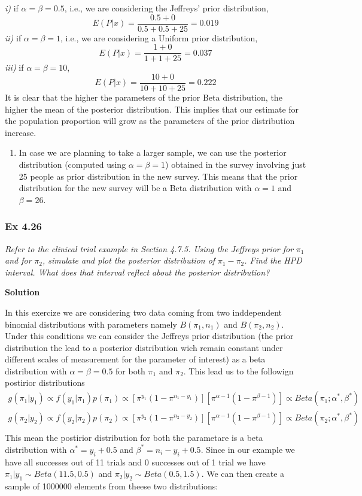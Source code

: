 \documentclass[
]{article}
\providecommand{\tightlist}{%
  \setlength{\itemsep}{0pt}\setlength{\parskip}{0pt}}
\begin{document}
\emph{i)} if \(\alpha=\beta=0.5\), i.e., we are considering the
Jeffreys' prior distribution, \[
E(P|x)=\frac{0.5 + 0}{0.5 + 0.5 + 25}= 0.019
\] \emph{ii)} if \(\alpha=\beta=1\), i.e., we are considering a Uniform
prior distribution, \[
E(P|x)=\frac{1 + 0}{1 + 1 + 25}= 0.037
\] \emph{iii)} if \(\alpha=\beta=10\), \[
E(P|x)=\frac{10 + 0}{10 + 10 + 25}= 0.222
\] It is clear that the higher the parameters of the prior Beta
distribution, the higher the mean of the posterior distribution. This
implies that our estimate for the population proportion will grow as the
parameters of the prior distribution increase.

\begin{enumerate}
\def\labelenumi{(\alph{enumi})}
\setcounter{enumi}{1}
\tightlist
\item
  In case we are planning to take a larger sample, we can use the
  posterior distribution (computed using \(\alpha=\beta=1\)) obtained in
  the survey involving just 25 people as prior distribution in the new
  survey. This means that the prior distribution for the new survey will
  be a Beta distribution with \(\alpha=1\) and \(\beta=26\).
\end{enumerate}

\hypertarget{ex-4.26}{%
\subsubsection{Ex 4.26}\label{ex-4.26}}

\emph{Refer to the clinical trial example in Section 4.7.5. Using the
Jeffreys prior for} \(\pi_1\) \emph{and for} \(\pi_2\)\emph{, simulate
and plot the posterior distribution of} \(\pi_1 -\pi_2\)\emph{. Find the
HPD interval. What does that interval reflect about the posterior
distribution?}

\textbf{Solution}

In this exercize we are considering two data coming from two
inddependent binomial distributions with parameters namely
\(B(\pi_1 ,n_1)\) and \(B(\pi_2,n_2)\). Under this conditions we can
consider the Jeffreys prior distribution (the prior distribution the
lead to a posterior distribution wich remain constant under different
scales of measurement for the parameter of interest) as a beta
distribution with \(\alpha=\beta=0.5\) for both \(\pi_1\) and \(\pi_2\).
This lead us to the followign postirior distributions \[
\begin{align*}
g(\pi_1|y_1)\propto f(y_1|\pi_1)p(\pi_1)\propto [\pi^{y_1}(1-\pi^{n_1-y_1})][\pi^{\alpha-1}(1-\pi^{\beta-1})]\propto Beta(\pi_1;\alpha^*,\beta^*)\\
g(\pi_2|y_2)\propto f(y_2|\pi_2)p(\pi_2)\propto [\pi^{y_2}(1-\pi^{n_2-y_2})][\pi^{\alpha-1}(1-\pi^{\beta-1})]\propto Beta(\pi_2;\alpha^*,\beta^*)\\
\end{align*}
\] This mean the postirior distribution for both the parametare is a
beta distribution with \(\alpha^*=y_i+0.5\) and \(\beta^*=n_i-y_i+0.5\).
Since in our example we have all successes out of 11 trials and 0
successes out of 1 trial we have \(\pi_1|y_1\sim Beta(11.5,0.5)\) and
\(\pi_2|y_2\sim Beta(0.5,1.5)\). We can then create a sample of 1000000
elements from theese two distributions:
\end{document}
